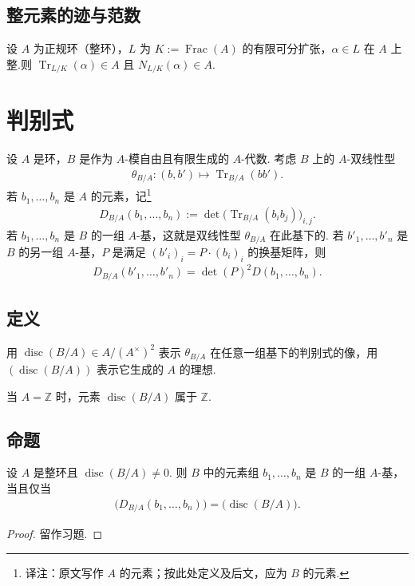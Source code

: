 \subsection{整元素的迹与范数}\label{sec:nt-2-3-4}
\begin{corollary*}
设 $A$ 为正规环（整环），$L$ 为 $K:=\operatorname{Frac}(A)$ 的有限可分扩张，$\alpha\in L$ 在 $A$ 上整.则 $\operatorname{Tr}_{L/K}(\alpha)\in A$ 且 $N_{L/K}(\alpha)\in A$.
\end{corollary*}




\section{判别式}\label{sec:nt-2-4}
设 $A$ 是环，$B$ 是作为 $A$-模自由且有限生成的 $A$-代数. 考虑 $B$ 上的 $A$-双线性型
\begin{align*}
\theta_{B/A}\colon(b,b')\longmapsto\operatorname{Tr}_{B/A}(bb').
\end{align*}
若 $b_1,\ldots,b_n$ 是 $A$ 的元素，记\footnote{译注：原文写作 $A$ 的元素；按此处定义及后文，应为 $B$ 的元素.}
\begin{align*}
D_{B/A}(b_1,\ldots,b_n):=\det\bigl(\operatorname{Tr}_{B/A}(b_ib_j)\bigr)_{i,j}.
\end{align*}
若 $b_1,\ldots,b_n$ 是 $B$ 的一组 $A$-基，这就是双线性型 $\theta_{B/A}$ 在此基下的. 若 $b'_1,\ldots,b'_n$ 是 $B$ 的另一组 $A$-基，$P$ 是满足 $(b'_i)_i=P\cdot(b_i)_i$ 的换基矩阵，则
\begin{align*}
D_{B/A}(b'_1,\ldots,b'_n)=\det(P)^2D(b_1,\ldots,b_n).
\end{align*}
\subsection{定义}\label{sec:nt-2-4-1}
\begin{definition*}
用 $\operatorname{disc}(B/A)\in A/(A^\times)^2$ 表示 $\theta_{B/A}$ 在任意一组基下的判别式的像，用 $(\operatorname{disc}(B/A))$ 表示它生成的 $A$ 的理想.
\end{definition*}
\begin{remark*}
当 $A=\mathbb Z$ 时，元素 $\operatorname{disc}(B/A)$ 属于 $\mathbb Z$.
\end{remark*}

\subsection{命题}\label{sec:nt-2-4-2}
\begin{proposition*}
设 $A$ 是整环且 $\operatorname{disc}(B/A)\ne0$. 则 $B$ 中的元素组 $b_1,\ldots,b_n$ 是 $B$ 的一组 $A$-基，当且仅当
\begin{align*}
\bigl(D_{B/A}(b_1,\ldots,b_n)\bigr)=\bigl(\operatorname{disc}(B/A)\bigr).
\end{align*}
\end{proposition*}
\begin{proof}
留作习题.
\end{proof}

